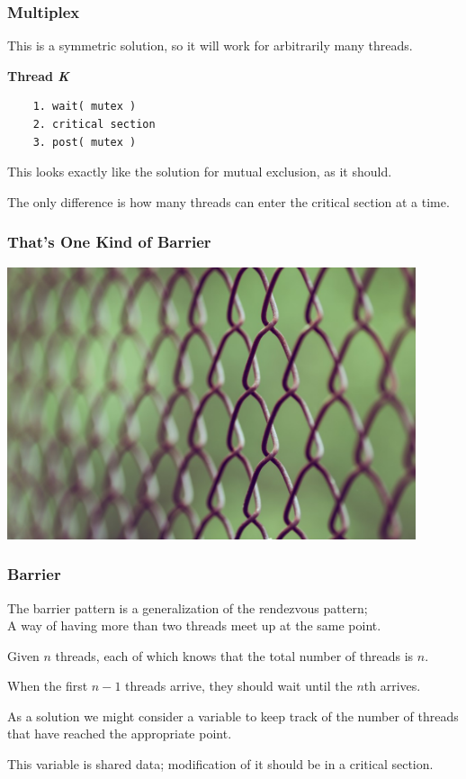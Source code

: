 \begin{frame}[fragile]
	\frametitle{Multiplex}


	This is a symmetric solution, so it will work for arbitrarily many threads.

	\textbf{Thread \textit{K}}\vspace{-6em}
	\begin{verbatim}
	1. wait( mutex )
	2. critical section
	3. post( mutex )
  \end{verbatim}
	\vspace{-2em}

	This looks exactly like the solution for mutual exclusion, as it should.

	The only difference is how many threads can enter the critical section at a time.



\end{frame}


\begin{frame}
	\frametitle{That's One Kind of Barrier}

	\begin{center}
		\includegraphics[width=0.9\textwidth]{images/fence-barrier.jpg}
	\end{center}

\end{frame}


\begin{frame}
	\frametitle{Barrier}

	The barrier pattern is a generalization of the rendezvous pattern;\\
	\quad A way of having more than two threads meet up at the same point.

	Given $n$ threads, each of which knows that the total number of threads is $n$.

	When the first $n-1$ threads arrive, they should wait until the $n$th arrives.

	As a solution we might consider a variable to keep track of the number of threads that have reached the appropriate point.

	This variable is shared data; modification of it should be in a critical section.


\end{frame}

